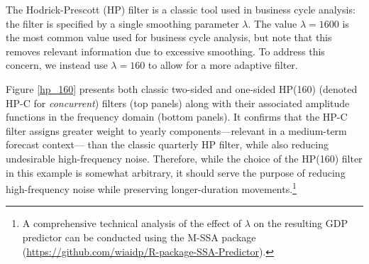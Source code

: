 \documentclass[11pt,a4paper]{article}
\begin{document}
The Hodrick-Prescott (HP) filter is a classic tool used in business cycle analysis: the filter is specified by a single smoothing parameter $\lambda$. The value $\lambda=1600$ is the most common value used for business cycle analysis, but \cite{Phillips_Jin_2021} note that this removes relevant information due to excessive smoothing. 
To address this concern, we instead use $\lambda = 160$ to allow for a more adaptive filter. 

Figure \ref{hp_160} presents both classic two-sided and one-sided HP(160) (denoted HP-C for \textit{concurrent}) filters (top panels) along with their associated amplitude functions in the frequency domain (bottom panels). It confirms that the HP-C filter assigns greater weight to yearly components—relevant in a medium-term forecast context— than the classic quarterly HP filter, while also reducing undesirable high-frequency noise. Therefore, while the choice of the HP(160) filter in this example
is somewhat arbitrary, it should serve the purpose of reducing high-frequency noise while preserving longer-duration movements.\footnote{A comprehensive technical analysis of the effect of $\lambda$ on the resulting GDP predictor can be conducted using the M-SSA package (\url{https://github.com/wiaidp/R-package-SSA-Predictor}).}
\end{document}
